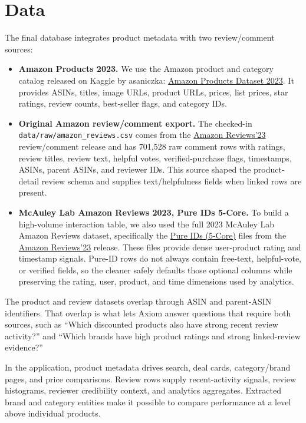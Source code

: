 \documentclass[10pt]{article}
\begin{document}
\section{Data}
The final database integrates product metadata with two review/comment sources:
\begin{itemize}
  \item \textbf{Amazon Products 2023.} We use the Amazon product and category
  catalog released on Kaggle by asaniczka:
  \href{https://www.kaggle.com/datasets/asaniczka/amazon-products-dataset-2023-1-4m-products}{Amazon Products Dataset 2023}. It provides ASINs, titles, image URLs,
  product URLs, prices, list prices, star ratings, review counts, best-seller
  flags, and category IDs.
  \item \textbf{Original Amazon review/comment export.} The checked-in
  \texttt{data/raw/amazon\_reviews.csv} comes from the
  \href{https://amazon-reviews-2023.github.io/main.html}{Amazon Reviews'23}
  review/comment release and has 701,528 raw comment rows with ratings, review
  titles, review text, helpful votes, verified-purchase flags, timestamps,
  ASINs, parent ASINs, and reviewer IDs. This source shaped the product-detail
  review schema and supplies text/helpfulness fields when linked rows are
  present.
  \item \textbf{McAuley Lab Amazon Reviews 2023, Pure IDs 5-Core.} To build a
  high-volume interaction table, we also used the full 2023 McAuley Lab Amazon
  Reviews dataset, specifically the
  \href{https://amazon-reviews-2023.github.io/data_processing/5core.html}{Pure IDs
  (5-Core)} files from the
  \href{https://amazon-reviews-2023.github.io/main.html}{Amazon Reviews'23}
  release. These files provide dense user-product rating and timestamp signals.
  Pure-ID rows do not always contain free-text, helpful-vote, or verified fields,
  so the cleaner safely defaults those optional columns while preserving the
  rating, user, product, and time dimensions used by analytics.
\end{itemize}

The product and review datasets overlap through ASIN and parent-ASIN identifiers.
That overlap is what lets Axiom answer questions that require both sources, such
as ``Which discounted products also have strong recent review activity?'' and
``Which brands have high product ratings and strong linked-review evidence?''

In the application, product metadata drives search, deal cards, category/brand
pages, and price comparisons. Review rows supply recent-activity signals,
review histograms, reviewer credibility context, and analytics aggregates.
Extracted brand and category entities make it possible to compare performance at
a level above individual products.
\end{document}
